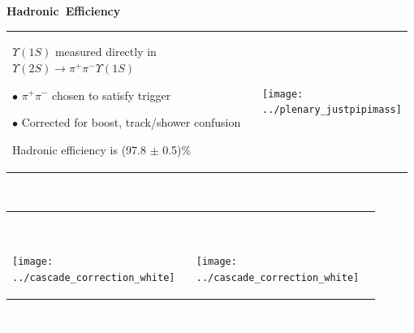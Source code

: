 \documentclass[landscape]{article}
\newenvironment{slide}[1][ ]{\mbox{\bf #1 } \vfill}{\vfill \mbox{ } \pagebreak}
\begin{document}
\begin{slide}[Hadronic Efficiency]

  \vspace{-1.5 cm}
  \begin{center}
    \begin{tabular}{p{0.63\linewidth} p{0.35\linewidth}}
      \begin{minipage}{\linewidth}
	$\Upsilon(1S)$ measured directly in $\Upsilon(2S) \to \pi^+\pi^- \Upsilon(1S)$

	\vspace{0.5 cm}
	\mbox{\hspace{0.25 cm}} {\large $\bullet$} $\pi^+\pi^-$ chosen to satisfy trigger

	\vspace{0.5 cm}
	\mbox{\hspace{0.25 cm}} {\large $\bullet$} Corrected for boost, track/shower confusion

	\vspace{0.5 cm}
	Hadronic efficiency is (97.8 $\pm$ 0.5)\%
      \end{minipage} &
      \begin{minipage}{\linewidth}
	\texttt{[image: ../plenary\_justpipimass]}
      \end{minipage}
    \end{tabular}
  \end{center}

  \textcolor{white}{Correct $\Upsilon(2,3S)$ for cascades to leptons}

  \vspace{0.1 cm}
  \begin{center}
    \begin{tabular}{p{0.45\linewidth} p{0.45\linewidth}}
      \begin{minipage}{\linewidth}
	\begin{center}
	  \textcolor{white}{$\mathcal{B}_{X\ell^+\ell^-}$ = (1.5 $\pm$ 0.4)\%}

	  \vspace{0.1 cm}
	  \texttt{[image: ../cascade\_correction\_white]}
	\end{center}
      \end{minipage} &
      \begin{minipage}{\linewidth}
	\begin{center}
	  \textcolor{white}{$\mathcal{B}_{X\ell^+\ell^-}$ = (1.4 $\pm$ 0.5)\%}

	  \vspace{0.1 cm}
	  \texttt{[image: ../cascade\_correction\_white]}
	\end{center}
      \end{minipage}
    \end{tabular}
  \end{center}

  \vspace{0.1 cm}
  \textcolor{white}{Hadronic efficiency is (96.1 $\pm$ 0.6)\% (2S) and (96.2 $\pm$ 0.7)\% (3S)}
\end{slide}
\end{document}
